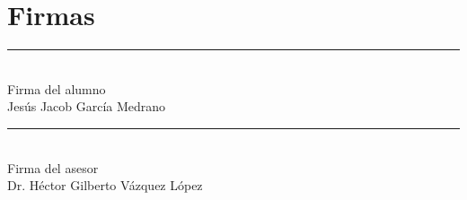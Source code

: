 \section{Firmas}

\vspace{3cm} %

\noindent
\begin{minipage}[t]{0.45\textwidth}
	\centering
	\rule{6cm}{0.4pt}\\
	Firma del alumno \\
	Jesús Jacob García Medrano
\end{minipage}
\hfill
\begin{minipage}[t]{0.45\textwidth}
	\centering
	\rule{6cm}{0.4pt}\\
	Firma del asesor\\
	Dr. Héctor Gilberto Vázquez López
	
\end{minipage}
